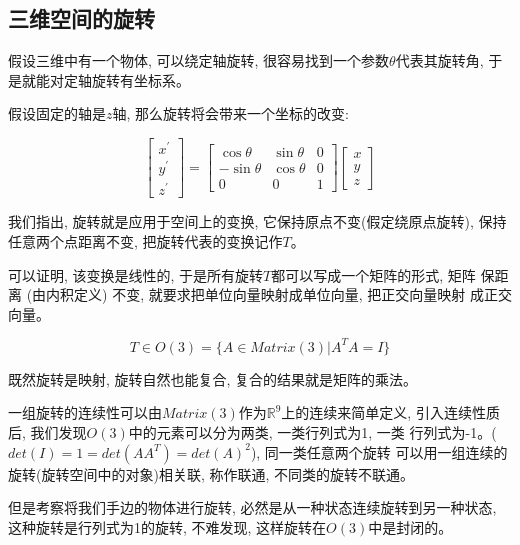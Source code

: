 \documentclass{ctexart}
\numberwithin{equation}{subsection}
\numberwithin{theorem}{subsection}
\numberwithin{definition}{subsection}
\numberwithin{proof}{subsection}
\numberwithin{lemma}{subsection}
\numberwithin{example}{subsection}
\numberwithin{remark}{subsection}
\numberwithin{corollary}{subsection}
\numberwithin{exercise}{subsection}
\numberwithin{problem}{subsection}
\numberwithin{question}{section}
\numberwithin{method}{subsection}
\begin{document}
    \subsection{三维空间的旋转}

    假设三维中有一个物体, 可以绕定轴旋转, 很容易找到一个参数$\theta$代表其旋转角,
    于是就能对定轴旋转有坐标系。

    假设固定的轴是$z$轴, 那么旋转将会带来一个坐标的改变:

    \begin{equation}
        \begin{bmatrix}
            x^\prime \\ y^\prime \\ z^\prime
        \end{bmatrix}
        = \begin{bmatrix}
            \cos\theta & \sin\theta & 0 \\
            -\sin\theta & \cos\theta & 0 \\
            0 & 0 & 1
        \end{bmatrix}
        \begin{bmatrix}
            x \\ y \\ z
        \end{bmatrix}
    \end{equation}

    我们指出, 旋转就是应用于空间上的变换, 它保持原点不变(假定绕原点旋转), 
    保持任意两个点距离不变, 把旋转代表的变换记作$T$。

    可以证明, 该变换是线性的, 于是所有旋转$T$都可以写成一个矩阵的形式, 矩阵
    保距离 (由内积定义) 不变, 就要求把单位向量映射成单位向量, 把正交向量映射
    成正交向量。

    \begin{equation}
        T \in O(3) = \{A \in Matrix(3) | A^T A = I\}
    \end{equation}

    既然旋转是映射, 旋转自然也能复合, 复合的结果就是矩阵的乘法。
    
    一组旋转的连续性可以由$Matrix(3)$作为$\mathbb{R}^9$上的连续来简单定义,
    引入连续性质后, 我们发现$O(3)$中的元素可以分为两类, 一类行列式为1, 一类
    行列式为-1。($det(I) = 1 = det(AA^T) = det(A) ^2$), 同一类任意两个旋转
    可以用一组连续的旋转(旋转空间中的对象)相关联, 称作联通, 不同类的旋转不联通。
    
    但是考察将我们手边的物体进行旋转, 必然是从一种状态连续旋转到另一种状态, 
    这种旋转是行列式为1的旋转, 不难发现, 这样旋转在$O(3)$中是封闭的。
\end{document}
